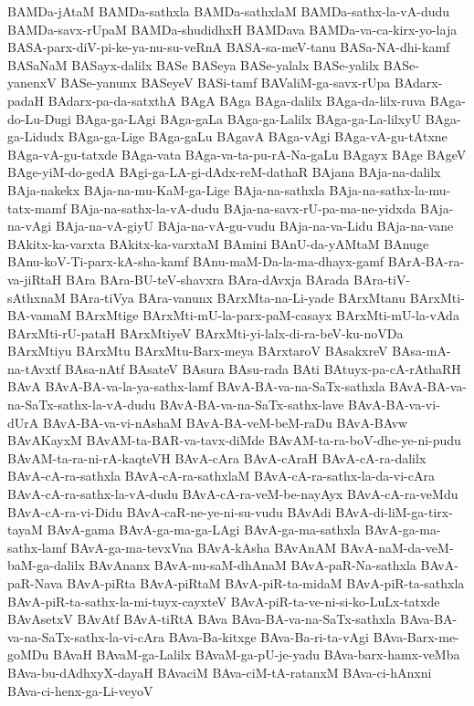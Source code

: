 {BAMDa-jAtaM
BAMDa-sathxla
BAMDa-sathxlaM
BAMDa-sathx-la-vA-dudu
BAMDa-savx-rUpaM
BAMDa-shudidhxH
BAMDava
BAMDa-va-ca-kirx-yo-laja
BASA-parx-diV-pi-ke-ya-nu-su-veRnA
BASA-sa-meV-tanu
BASa-NA-dhi-kamf
BASaNaM
BASayx-dalilx
BASe
BASeya
BASe-yalalx
BASe-yalilx
BASe-yanenxV
BASe-yanunx
BASeyeV
BASi-tamf
BAValiM-ga-savx-rUpa
BAdarx-padaH
BAdarx-pa-da-satxthA
BAgA
BAga
BAga-dalilx
BAga-da-lilx-ruva
BAga-do-Lu-Dugi
BAga-ga-LAgi
BAga-gaLa
BAga-ga-Lalilx
BAga-ga-La-lilxyU
BAga-ga-Lidudx
BAga-ga-Lige
BAga-gaLu
BAgavA
BAga-vAgi
BAga-vA-gu-tAtxne
BAga-vA-gu-tatxde
BAga-vata
BAga-va-ta-pu-rA-Na-gaLu
BAgayx
BAge
BAgeV
BAge-yiM-do-gedA
BAgi-ga-LA-gi-dAdx-reM-dathaR
BAjana
BAja-na-dalilx
BAja-nakekx
BAja-na-mu-KaM-ga-Lige
BAja-na-sathxla
BAja-na-sathx-la-mu-tatx-mamf
BAja-na-sathx-la-vA-dudu
BAja-na-savx-rU-pa-ma-ne-yidxda
BAja-na-vAgi
BAja-na-vA-giyU
BAja-na-vA-gu-vudu
BAja-na-va-Lidu
BAja-na-vane
BAkitx-ka-varxta
BAkitx-ka-varxtaM
BAmini
BAnU-da-yAMtaM
BAnuge
BAnu-koV-Ti-parx-kA-sha-kamf
BAnu-maM-Da-la-ma-dhayx-gamf
BArA-BA-ra-va-jiRtaH
BAra
BAra-BU-teV-shavxra
BAra-dAvxja
BArada
BAra-tiV-sAthxnaM
BAra-tiVya
BAra-vanunx
BArxMta-na-Li-yade
BArxMtanu
BArxMti-BA-vamaM
BArxMtige
BArxMti-mU-la-parx-paM-casayx
BArxMti-mU-la-vAda
BArxMti-rU-pataH
BArxMtiyeV
BArxMti-yi-lalx-di-ra-beV-ku-noVDa
BArxMtiyu
BArxMtu
BArxMtu-Barx-meya
BArxtaroV
BAsakxreV
BAsa-mA-na-tAvxtf
BAsa-nAtf
BAsateV
BAsura
BAsu-rada
BAti
BAtuyx-pa-cA-rAthaRH
BAvA
BAvA-BA-va-la-ya-sathx-lamf
BAvA-BA-va-na-SaTx-sathxla
BAvA-BA-va-na-SaTx-sathx-la-vA-dudu
BAvA-BA-va-na-SaTx-sathx-lave
BAvA-BA-va-vi-dUrA
BAvA-BA-va-vi-nAshaM
BAvA-BA-veM-beM-raDu
BAvA-BAvw
BAvAKayxM
BAvAM-ta-BAR-va-tavx-diMde
BAvAM-ta-ra-boV-dhe-ye-ni-pudu
BAvAM-ta-ra-ni-rA-kaqteVH
BAvA-cAra
BAvA-cAraH
BAvA-cA-ra-dalilx
BAvA-cA-ra-sathxla
BAvA-cA-ra-sathxlaM
BAvA-cA-ra-sathx-la-da-vi-cAra
BAvA-cA-ra-sathx-la-vA-dudu
BAvA-cA-ra-veM-be-nayAyx
BAvA-cA-ra-veMdu
BAvA-cA-ra-vi-Didu
BAvA-caR-ne-ye-ni-su-vudu
BAvAdi
BAvA-di-liM-ga-tirx-tayaM
BAvA-gama
BAvA-ga-ma-ga-LAgi
BAvA-ga-ma-sathxla
BAvA-ga-ma-sathx-lamf
BAvA-ga-ma-tevxVna
BAvA-kAsha
BAvAnAM
BAvA-naM-da-veM-baM-ga-dalilx
BAvAnanx
BAvA-nu-saM-dhAnaM
BAvA-paR-Na-sathxla
BAvA-paR-Nava
BAvA-piRta
BAvA-piRtaM
BAvA-piR-ta-midaM
BAvA-piR-ta-sathxla
BAvA-piR-ta-sathx-la-mi-tuyx-cayxteV
BAvA-piR-ta-ve-ni-si-ko-LuLx-tatxde
BAvAsetxV
BAvAtf
BAvA-tiRtA
BAva
BAva-BA-va-na-SaTx-sathxla
BAva-BA-va-na-SaTx-sathx-la-vi-cAra
BAva-Ba-kitxge
BAva-Ba-ri-ta-vAgi
BAva-Barx-me-goMDu
BAvaH
BAvaM-ga-Lalilx
BAvaM-ga-pU-je-yadu
BAva-barx-hamx-veMba
BAva-bu-dAdhxyX-dayaH
BAvaciM
BAva-ciM-tA-ratanxM
BAva-ci-hAnxni
BAva-ci-henx-ga-Li-veyoV
}
